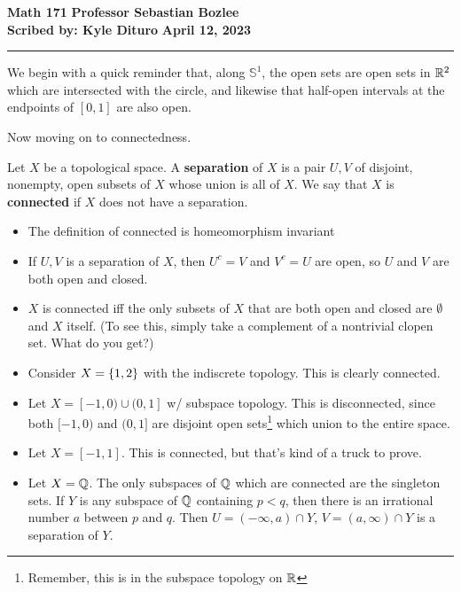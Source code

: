 \documentclass[12pt, twosided]{article}
\begin{document}
\noindent \textbf{Math 171} \hfill \textbf{Professor Sebastian Bozlee} \\
\textbf{Scribed by: Kyle Dituro} \hfill \textbf{April 12, 2023}\hrule
\vspace{.2in}

We begin with a quick reminder that, along \(\mathbb{S}^1\), the open sets are open sets in \(\mathbb{R}^2\) which are intersected with the circle, and likewise that half-open intervals at the endpoints of \([0, 1]\) are also open.

Now moving on to connectedness.


\begin{df}
  Let \(X\) be a topological space. A \textbf{separation} of \(X\) is a pair \(U, V\) of disjoint, nonempty, open subsets of \(X\) whose union is all of \(X\). We say that \(X\) is \textbf{connected} if \(X\) does not have a separation.
\end{df}


\begin{rmk}
  \begin{itemize}
  \item The definition of connected is homeomorphism invariant
  \item If \(U, V\) is a separation of \(X\), then \(U^c = V\) and \(V^c = U\) are open, so \(U\) and \(V\) are both open and closed.
  \item \(X\) is connected iff the only subsets of \(X\) that are both open and closed are \(\emptyset\) and \(X\) itself. (To see this, simply take a complement of a nontrivial clopen set. What do you get?)
  \end{itemize}
\end{rmk}

\begin{exa}
  \begin{itemize}
  \item Consider \(X = \left\{ 1, 2 \right\}\) with the indiscrete topology. This is clearly connected.
  \item Let \(X = [-1, 0) \cup (0, 1]\) w/ subspace topology. This is disconnected, since both \([-1, 0)\) and \((0,1]\) are disjoint open sets\footnote{Remember, this is in the subspace topology on \(\mathbb{R}\)} which union to the entire space.
  \item Let \(X = [-1, 1]\). This is connected, but that's kind of a truck to prove.
  \item Let \(X = \mathbb{Q}\). The only subspaces of \(\mathbb{Q}\) which are connected are the singleton sets. If \(Y\) is any subspace of \(\mathbb{Q}\) containing \(p < q\), then there is an irrational number \(a\) between \(p\) and \(q\). Then \(U = (-\infty, a) \cap Y\), \(V = (a, \infty) \cap Y\) is a separation of \(Y\).
  \end{itemize}
\end{exa}
\end{document}

